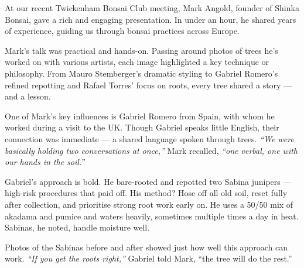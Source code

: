 \label{2025-05-marktalk}
\noindent


At our recent Twickenham Bonsai Club meeting, Mark Angold, founder of Shinka Bonsai, gave a rich and engaging presentation. In under an hour, he shared years of experience, guiding us through bonsai practices across Europe.

Mark's talk was practical and hands\--on. Passing around photos of trees he's worked on with various artists, each image highlighted a key technique or philosophy. From Mauro Stemberger's dramatic styling to Gabriel Romero's refined repotting and Rafael Torres' focus on roots, every tree shared a story --- and a lesson.

\medskip
{}
\noindent
One of Mark's key influences is Gabriel Romero from Spain, with whom he worked during a visit to the UK. Though Gabriel speaks little English, their connection was immediate --- a shared language spoken through trees. \textit{``We were basically holding two conversations at once,''} Mark recalled, \textit{``one verbal, one with our hands in the soil.''}

Gabriel's approach is bold. He bare\--rooted and repotted two Sabina junipers --- high\--risk procedures that paid off. His method? Hose off all old soil, reset fully after collection, and prioritise strong root work early on. He uses a 50/50 mix of akadama and pumice and waters heavily, sometimes multiple times a day in heat. Sabinas, he noted, handle moisture well.

Photos of the Sabinas before and after showed just how well this approach can work. \textit{``If you get the roots right,''} Gabriel told Mark, ``the tree will do the rest.'' %

